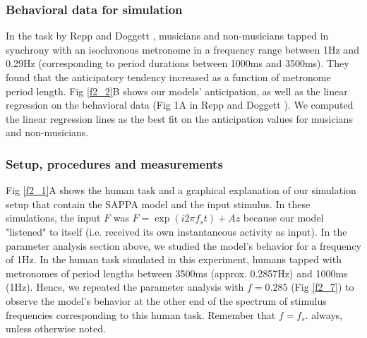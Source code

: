 \documentclass{report}
\begin{document}
\subsubsection{Behavioral data for simulation}

In the task by Repp and Doggett \cite{repp2007tapping}, musicians and non-musicians tapped in synchrony with an isochronous metronome in a frequency range between 1Hz and 0.29Hz (corresponding to period durations between 1000ms and 3500ms). They found that the anticipatory tendency increased as a function of metronome period length. Fig \ref{f2_2}B shows our models' anticipation, as well as the linear regression on the behavioral data (Fig 1A in Repp and Doggett \cite{repp2007tapping}). We computed the linear regression lines as the best fit on the anticipation values for musicians and non-musicians.

\subsubsection{Setup, procedures and measurements}

Fig \ref{f2_1}A shows the human task and a graphical explanation of our simulation setup that contain the SAPPA model and the input stimulus. In these simulations, the input $F$ was $F = \exp(i2\pi f_s t) + Az$ because our model "listened" to itself (i.e. received its own instantaneous activity as input). In the parameter analysis section above, we studied the model's behavior for a frequency of 1Hz. In the human task simulated in this experiment, humans tapped with metronomes of period lengths between 3500ms (approx. 0.2857Hz) and 1000ms (1Hz). Hence, we repeated the parameter analysis with $f = 0.285$ (Fig \ref{f2_7}) to observe the model's behavior at the other end of the spectrum of stimulus frequencies corresponding to this human task. Remember that $f = f_s$. always, unless otherwise noted.
\end{document}
